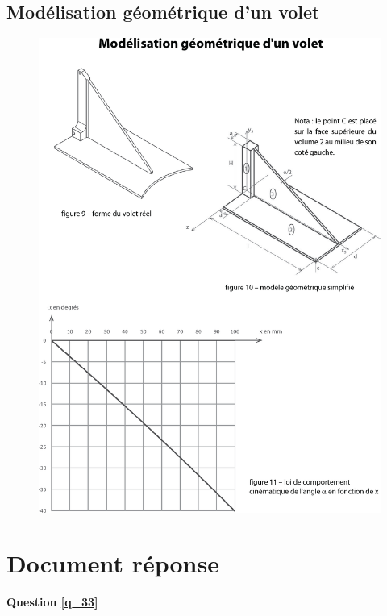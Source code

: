 \documentclass[10pt,fleqn]{article} %
\begin{document}
\subsection{\label{ann_04}Modélisation géométrique d'un volet}
\begin{figure}[H]
\centering
\includegraphics[width=\linewidth]{ann_d}
\end{figure}

\newpage 
\section{Document réponse}


\textbf{Question \ref{q_33}}
\end{document}
